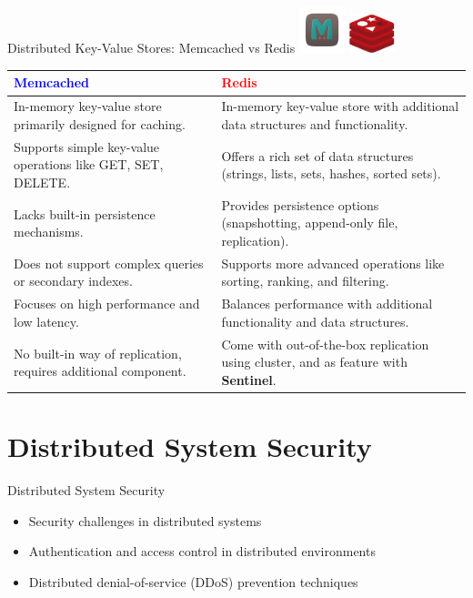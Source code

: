 \documentclass{beamer}
\begin{document}
\begin{frame}{Distributed Key-Value Stores: Memcached vs Redis}
	\includegraphics[width=0.1\textwidth]{img/memcached_image.png}		\hfill
    \includegraphics[width=0.1\textwidth]{img/redis_image.png}
  \begin{table}[h]
    \centering
    \footnotesize
    \renewcommand{\arraystretch}{1.5}
    \begin{tabular}{|p{}|p{}|}
      \hline
      \rowcolor[RGB]{232,232,232}
      \textbf{\textcolor{blue}{Memcached}} & \textbf{\textcolor{red}{Redis}} \\
      \hline
      In-memory key-value store primarily designed for caching.
      & 
      In-memory key-value store with additional data structures and functionality.
      \\
      \hline
      Supports simple key-value operations like GET, SET, DELETE. &
      Offers a rich set of data structures (strings, lists, sets, hashes, sorted sets). \\
      \hline
      Lacks built-in persistence mechanisms. &
      Provides persistence options (snapshotting, append-only file, replication). \\
      \hline
      Does not support complex queries or secondary indexes. &
      Supports more advanced operations like sorting, ranking, and filtering. \\
      \hline
      Focuses on high performance and low latency. &
      Balances performance with additional functionality and data structures. \\
      \hline
      No built-in way of replication, requires additional component. &
      Come with out-of-the-box replication using cluster, and as feature with \textbf{Sentinel}. \\
      \hline
    \end{tabular}
  \end{table}
\end{frame}


\section{Distributed System Security}
\begin{frame}{Distributed System Security}
  \begin{itemize}
    \item Security challenges in distributed systems
    \item Authentication and access control in distributed environments
    \item Distributed denial-of-service (DDoS) prevention techniques
  \end{itemize}
\end{frame}
\end{document}
